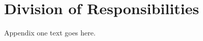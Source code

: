 \documentclass[12pt,journal]{IEEEtran}
\begin{document}



%
%

{}


\appendices
\section{Division of Responsibilities}
Appendix one text goes here.
\end{document}
